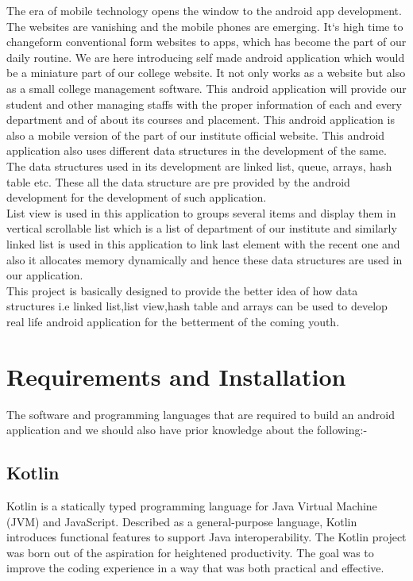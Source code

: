 \documentclass[11pt,a4paper]{report}
\begin{document}
		The era of mobile technology opens the window to the android app development. The websites are vanishing and the mobile phones are emerging. It`s high time to changeform conventional form websites to apps, which has become the part of our daily routine. We are here introducing self made android application which would be a miniature part of our college website. It not only works as a website but also as a small college management software. This android application will provide our student and other managing staffs with the proper information of each and every department and of about its courses and placement. This android application is also a mobile version of the part of our institute official website.
		This android application also uses different data structures in the development of the same. The data structures used in its development are linked list, queue, arrays, hash table etc. These all the data structure are pre provided by the android development for the development of such application.\\List view is used in this application to groups several items and display them in vertical scrollable list which is a list of department of our institute and similarly linked list is used in this application to link last element with the recent one and also it allocates memory dynamically and hence these data structures are used in our application.
		\\
		This project is basically designed to provide the better idea of how data structures i.e linked list,list view,hash table and arrays can be used to develop real life android application for the betterment of the coming youth.
		\vskip 30cm
		  \section*{\Large{Requirements and Installation}}
		  
		The software and programming languages that are required to build an android application and we should also have prior knowledge about the following:-
		
		\subsection*{\Large{Kotlin}}
		
		Kotlin is a statically typed programming language for Java Virtual Machine (JVM) and JavaScript. Described as a general-purpose language, Kotlin introduces functional features to support Java interoperability. The Kotlin project was born out of the aspiration for heightened productivity. The goal was to improve the coding experience in a way that was both practical and effective.
		
\end{document}
